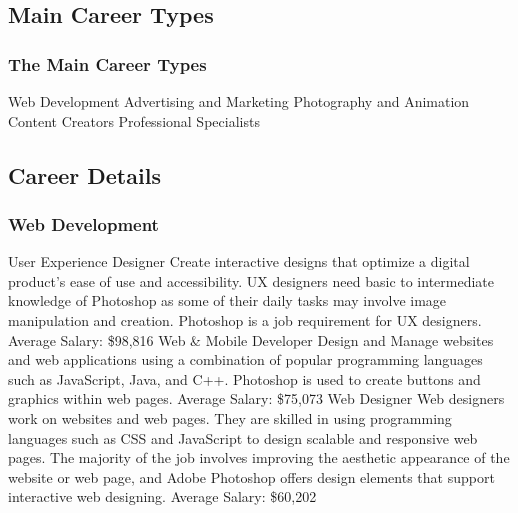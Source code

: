 \documentclass{beamer}
\begin{document}
\subsection{Main Career Types}		
	\begin{frame}
		\frametitle{The Main Career Types}
		\begin{outline}
			\1 Web Development
			\1 Advertising and Marketing
			\1 Photography and Animation
			\1 Content Creators
			\1 Professional Specialists
		\end{outline}
	\end{frame}

\subsection{Career Details}		
	\begin{frame}
		\frametitle{Web Development}
		\begin{outline}
			\1 User Experience Designer
			\2 Create interactive designs that optimize a digital product’s ease of use and accessibility. UX designers need basic to intermediate knowledge of Photoshop as some of their daily tasks may involve image manipulation and creation. Photoshop is a job requirement for UX designers.
			\2 Average Salary:  \$98,816
			\1 Web \& Mobile Developer 
			\2 Design and Manage websites and web applications using a combination of popular programming languages such as JavaScript, Java, and C++.  Photoshop is used to create buttons and graphics within web pages. 
			\2 Average Salary:  \$75,073
			\1 Web Designer 
			\2 Web designers work on websites and web pages. They are skilled in using programming languages such as CSS and JavaScript to design scalable and responsive web pages. The majority of the job involves improving the aesthetic appearance of the website or web page, and Adobe Photoshop offers design elements that support interactive web designing.
			\2 Average Salary:  \$60,202
		\end{outline}
	\end{frame}
\end{document}
